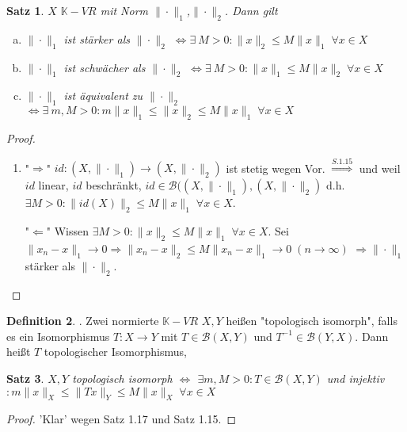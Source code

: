 \documentclass[ngerman]{report}
\theoremstyle{plain}%
\newtheorem{thm}{Satz}[chapter]
\theoremstyle{definition}%
\newtheorem{definition}[thm]{Definition}
\theoremstyle{myStyle}
\newcommand{\K}{\mathbb{K}}
\newcommand{\B}{\mathcal{B}} %
\newcommand{\BS}[1][X,Y]{\mathcal{B}(#1)} %
\newcommand{\norm}[1]{\|#1\|}
\newcommand{\df}[1][]{%
	\overset{#1}{\Rightarrow}
}
\newcommand{\aq}{\Leftrightarrow} %
\newcommand{\inv}[1]{#1^{-1}}
\newcommand{\qmarks}[1]{"{}#1"{}}
\begin{document}
	\begin{thm}
		$X$ $\K-VR$ mit Norm $\norm{\cdot}_1$,$\norm{\cdot}_2$. Dann gilt 
			\begin{enumerate}[(a)]
				\item $\norm{\cdot}_1$ ist stärker als $\norm{\cdot}_2$ 
					$\aq \exists \: M > 0: \norm{x}_2 \leq M \norm{x}_1 \; \forall x\in X$
				\item $\norm{\cdot}_1$ ist schwächer als $\norm{\cdot}_2$ 
					$\aq \exists \: M > 0: \norm{x}_1 \leq M \norm{x}_2 \; \forall x\in X$
				\item $\norm{\cdot}_1$ ist äquivalent zu $\norm{\cdot}_2$ 
					$\aq \exists \: m,M > 0: m\norm{x}_1 \leq \norm{x}_2 \leq M \norm{x}_1 \; \forall x\in X$
			\end{enumerate}
	
	\end{thm}
	\begin{proof}
		\begin{enumerate}[zu (a):]
	 		\item \qmarks{$\df$} $id : (X,\norm{\cdot}_1) \to (X,\norm{\cdot}_2)$ ist stetig wegen Vor.
				$\df[S.1.15]$ und weil $id$ linear, $id$ beschränkt, 
				$id\in \B((X,\norm{\cdot}_1), (X,\norm{\cdot}_2)$ d.h. 
				$\exists M > 0: \norm{id(X)}_2 \leq M \norm{x}_1 \; \forall x\in X$.\par
			\qmarks{$\Leftarrow$}	Wissen $\exists M>0: \norm{x}_2 \leq M\norm{x}_1 \; \forall x\in X$.
			Sei $\norm{x_n - x}_1 \to 0 \df \norm{x_n - x}_2 \leq M\norm{x_n - x}_1 \to 0 \; (n\to\infty)$
			$\df \norm{\cdot}_1$ stärker als $\norm{\cdot}_2$.
	 	\end{enumerate}
	\end{proof}

	\begin{definition}
		.
		Zwei normierte $\K-VR$ $X,Y$ heißen \qmarks{topologisch isomorph}, falls es ein Isomorphismus 
		$T: X\to Y$ mit $T\in \BS$ und $\inv{T}\in\B(Y,X)$. Dann heißt $T$ topologischer Isomorphismus,
	\end{definition}

	\begin{thm}
		$X, Y$ topologisch isomorph $\aq$ $\exists m,M > 0: T\in \BS$ und injektiv
		$: m\norm{x}_X \leq \norm{Tx}_Y \leq M \norm{x}_X \; \forall x\in X$
	\end{thm}
	\begin{proof}
		'Klar' wegen Satz 1.17 und Satz 1.15.
	\end{proof}
	
\end{document}
